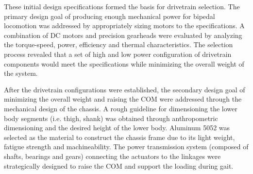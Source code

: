 These initial design specifications formed the basis for drivetrain selection. The primary design goal of producing enough mechanical power for bipedal locomotion was addressed by appropriately sizing motors to the specifications. A combination of DC motors and precision gearheads were evaluated by analyzing the torque-speed, power, efficiency and thermal characteristics. The selection process revealed that a set of high and low power configuration of drivetrain components would meet the specifications while minimizing the overall weight of the system. 

After the drivetrain configurations were established, the secondary design goal of minimizing the overall weight and raising the COM were addressed through the mechanical design of the chassis. A rough guideline for dimensioning the lower body segments (i.e. thigh, shank) was obtained through anthropometric dimensioning and the desired height of the lower body. Aluminum 5052 was selected as the material to construct the chassis frame due to its light weight, fatigue strength and machineability. The power transmission system (composed of shafts, bearings and gears) connecting the actuators to the linkages were strategically designed to raise the COM and support the loading during gait. 

